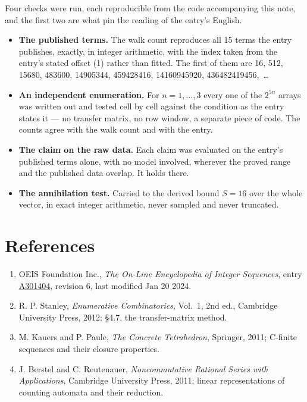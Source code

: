 \documentclass[11pt]{article}
\theoremstyle{definition}
\begin{document}
Four checks were run, each reproducible from the code accompanying this note, and the first two are what pin the reading of the entry's English.

\begin{itemize}

\item {\bfseries The published terms.} The walk count reproduces all 15 terms the entry publishes, exactly, in integer arithmetic, with the index taken from the entry's stated offset (1) rather than fitted. The first of them are 16, 512, 15680, 483600, 14905344, 459428416, 14160945920, 436482419456,~\dots

\item {\bfseries An independent enumeration.} For $n = 1,\dots,3$ every one of the $2^{5n}$ arrays was written out and tested cell by cell against the condition as the entry states it --- no transfer matrix, no row window, a separate piece of code. The counts agree with the walk count and with the entry.

\item {\bfseries The claim on the raw data.} Each claim was evaluated on the entry's published terms alone, with no model involved, wherever the proved range and the published data overlap. It holds there.

\item {\bfseries The annihilation test.} Carried to the derived bound $S = 16$ over the whole vector, in exact integer arithmetic, never sampled and never truncated.

\end{itemize}

\section{References}

\begin{enumerate}

\item OEIS Foundation Inc., \emph{The On-Line Encyclopedia of Integer Sequences}, entry \href{https://oeis.org/A301404}{A301404}, revision 6, last modified Jan 20 2024.

\item R. P. Stanley, \emph{Enumerative Combinatorics}, Vol.~1, 2nd ed., Cambridge University Press, 2012; \S4.7, the transfer-matrix method.

\item M. Kauers and P. Paule, \emph{The Concrete Tetrahedron}, Springer, 2011; C-finite sequences and their closure properties.

\item J. Berstel and C. Reutenauer, \emph{Noncommutative Rational Series with Applications}, Cambridge University Press, 2011; linear representations of counting automata and their reduction.

\end{enumerate}
\end{document}
